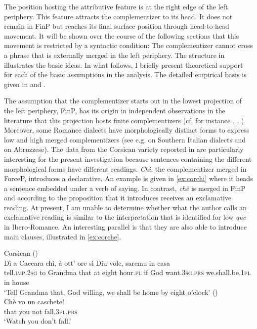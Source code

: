 The position  hosting the attributive feature  is at the right edge of the left periphery. This feature attracts the complementizer to its head. It does not remain in FinP but reaches its final surface position  through head-to-head movement. It will be shown over the course of the following sections that this movement is restricted by a syntactic condition: The complementizer cannot cross a phrase that is externally merged in the left periphery. The structure in  illustrates the basic ideas. In what follows, I briefly present  theoretical support for each of the basic assumptions in the analysis. The detailed empirical basis is  given in  and .

The assumption that the complementizer starts out in the lowest projection of the left periphery, FinP, has its origin in independent observations in the literature that this projection hosts finite complementizers (cf. for instance \citealt{Belletti2009}, \citeyear{Belletti2013}, \citealt{Ledgeway2005}).  Moreover, some Romance dialects have morphologically distinct forms to express low and high merged complementizers (see e.g. \citealt{Ledgeway2005} on Southern Italian dialects and \citealt{DAlessandro2015} on Abruzzese). The data from the Corsican variety reported in \citet{Ledgeway2012} are particularly interesting  for the present investigation because sentences containing the different morphological forms have different readings. \emph{Chì}, the complementizer merged in ForceP, introduces a declarative. An example is given in \eqref{ex:corchi} where it heads a sentence embedded under a verb of saying.  In contrast, \emph{chè} is merged in FinP and according to \citet{Ledgeway2012} the proposition that it introduces receives an exclamative reading. At present, I am unable to  determine whether what the author calls an exclamative reading is similar to  the interpretation that is identified for low \emph{que} in Ibero-Romance. An  interesting parallel is that they are also able to introduce main clauses, illustrated in \eqref{ex:corche}.\largerpage[-2]



\ea Corsican
\ea\label{ex:corchi}   (\citealt[175: ex i.a]{Ledgeway2012})\\ \gll Dì  a Caccara chì, à ott’ ore sì Diu vole, saremu in casa \\
		tell.\textsc{imp.2sg} to Grandma that at eight hour.\textsc{pl} if God want.\textsc{3sg.prs} we.shall.be.\textsc{1pl} in house\\
		\glt `Tell Grandma that, God willing, we shall be home by eight o’clock' 
		\ex\label{ex:corche}  (\citealt[175: ex i.b]{Ledgeway2012}) \\\gll Chè vo un caschete! \\
		that you not fall.\textsc{3pl.prs}\\
		\glt `Watch you don’t fall.'  
	\z
	\z

